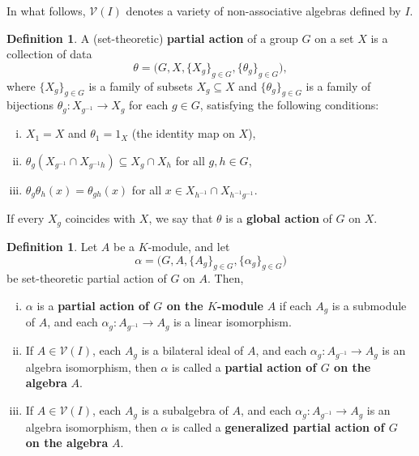 \documentclass[11pt]{amsart}
\numberwithin{equation}{section}
\theoremstyle{definition}
\newtheorem{definition}[theorem]{Definition}
\theoremstyle{remark}
\begin{document}
In what follows, \( \mathcal{V}(I) \) denotes a variety  of non-associative algebras defined by \( I \).

\begin{definition} \label{d: set partial group action}
    A (set-theoretic) \textbf{partial action} of a group \( G \) on a set \( X \) is a collection of data 
    \[
        \theta = \big( G, X, \{ X_{g} \}_{g \in G}, \{ \theta_{g} \}_{g \in G} \big),
    \]
    where \( \{ X_g \}_{g \in G} \) is a family of subsets \( X_g \subseteq X \) and \( \{ \theta_g \}_{g \in G} \) is a family of bijections \( \theta_g: X_{g^{-1}} \to X_g \) for each \( g \in G \), satisfying the following conditions:
    \begin{enumerate}[(i)]
        \item \( X_1 = X \) and \( \theta_1 = 1_X \) (the identity map on \( X \)),
        \item \( \theta_g(X_{g^{-1}} \cap X_{g^{-1}h}) \subseteq X_g \cap X_h \) for all \( g, h \in G \),
        \item \( \theta_g \theta_h(x) = \theta_{gh}(x) \) for all \( x \in X_{h^{-1}} \cap X_{h^{-1}g^{-1}} \).
    \end{enumerate}
    If every \( X_g \) coincides with \( X \), we say that \( \theta \) is a \textbf{global action} of \( G \) on \( X \).
\end{definition}



\begin{definition} \label{d: partial group action}
 Let \( A \) be a \( K \)-module, and let 
        \[
            \alpha = \big( G, A, \{ A_{g} \}_{g \in G}, \{ \alpha_{g} \}_{g \in G} \big)
        \]
        be set-theoretic partial action of \( G \) on \( A \). Then,
        \begin{enumerate}[(i)]
            \item \(\alpha\) is a \textbf{partial action of \(G\) on the \(K\)-module} \(A\) if each \(A_g\) is a submodule of \(A\), and each \(\alpha_g: A_{g^{-1}} \to A_g\) is a linear isomorphism.

            \item If \(A \in \mathcal{V}(I)\), each \(A_g\) is a bilateral ideal of \(A\), and each \(\alpha_g: A_{g^{-1}} \to A_g\) is an algebra isomorphism, then \(\alpha\) is called a \textbf{partial action of \(G\) on the algebra} \(A\).

            \item If \(A \in \mathcal{V}(I)\), each \(A_g\) is a subalgebra of \(A\), and each \(\alpha_g: A_{g^{-1}} \to A_g\) is an algebra isomorphism, then \(\alpha\) is called a \textbf{ generalized partial action of \(G\) on the algebra} \(A\).
        \end{enumerate}
    \end{definition}
\end{document}
